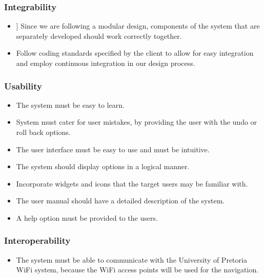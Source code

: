 \documentclass{article}
\begin{document}
		\subsubsection{Integrability}
		
			\begin{itemize}
				\item] Since we are following a modular design, components of the system that are separately developed should work correctly together.
				\item Follow coding standards specified by the client to allow for easy integration and employ continuous integration in our design process.
			\end{itemize}
		
		\subsubsection{Usability}
		
			\begin{itemize}
				\item The system must be easy to learn.
				\item System must cater for user mistakes, by providing the user with the undo or roll back options.
				\item The user interface must be easy to use and must be intuitive.
				\item The system should display options in a logical manner.
				\item Incorporate widgets and icons that the target users may be familiar with.
				\item The user manual should have a detailed description of the system.
				\item A help option must be provided to the users.
			\end{itemize}
		
		\subsubsection{Interoperability}
			\begin{itemize}
				\item The system must be able to communicate with the University of Pretoria WiFi system, because the WiFi  access points will be used for the navigation.
			\end{itemize}
\end{document}
